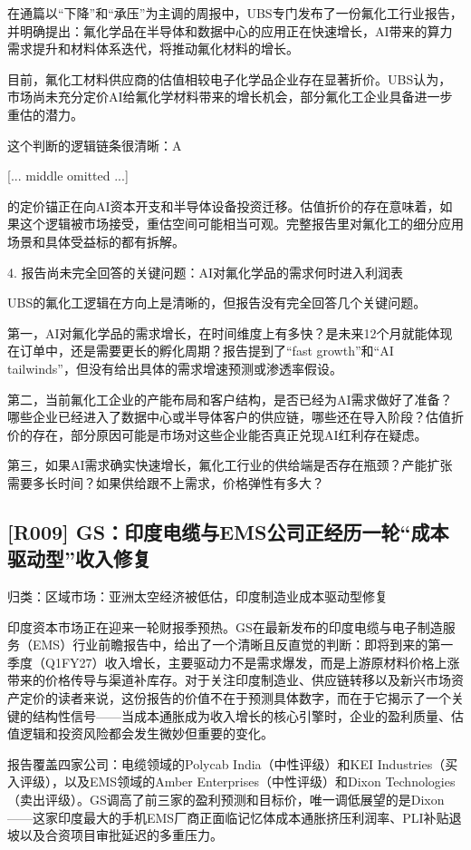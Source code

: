 \documentclass[11pt]{ctexart}
\begin{document}
在通篇以“下降”和“承压”为主调的周报中，UBS专门发布了一份氟化工行业报告，并明确提出：氟化学品在半导体和数据中心的应用正在快速增长，AI带来的算力需求提升和材料体系迭代，将推动氟化材料的增长。

目前，氟化工材料供应商的估值相较电子化学品企业存在显著折价。UBS认为，市场尚未充分定价AI给氟化学材料带来的增长机会，部分氟化工企业具备进一步重估的潜力。

这个判断的逻辑链条很清晰：A

[... middle omitted ...]

的定价锚正在向AI资本开支和半导体设备投资迁移。估值折价的存在意味着，如果这个逻辑被市场接受，重估空间可能相当可观。完整报告里对氟化工的细分应用场景和具体受益标的都有拆解。

4. 报告尚未完全回答的关键问题：AI对氟化学品的需求何时进入利润表

UBS的氟化工逻辑在方向上是清晰的，但报告没有完全回答几个关键问题。

第一，AI对氟化学品的需求增长，在时间维度上有多快？是未来12个月就能体现在订单中，还是需要更长的孵化周期？报告提到了“fast growth”和“AI tailwinds”，但没有给出具体的需求增速预测或渗透率假设。

第二，当前氟化工企业的产能布局和客户结构，是否已经为AI需求做好了准备？哪些企业已经进入了数据中心或半导体客户的供应链，哪些还在导入阶段？估值折价的存在，部分原因可能是市场对这些企业能否真正兑现AI红利存在疑虑。

第三，如果AI需求确实快速增长，氟化工行业的供给端是否存在瓶颈？产能扩张需要多长时间？如果供给跟不上需求，价格弹性有多大？

\subsection{[R009] GS：印度电缆与EMS公司正经历一轮“成本驱动型”收入修复}
{\small\color{refgray}归类：区域市场：亚洲太空经济被低估，印度制造业成本驱动型修复}

印度资本市场正在迎来一轮财报季预热。GS在最新发布的印度电缆与电子制造服务（EMS）行业前瞻报告中，给出了一个清晰且反直觉的判断：即将到来的第一季度（Q1FY27）收入增长，主要驱动力不是需求爆发，而是上游原材料价格上涨带来的价格传导与渠道补库存。对于关注印度制造业、供应链转移以及新兴市场资产定价的读者来说，这份报告的价值不在于预测具体数字，而在于它揭示了一个关键的结构性信号——当成本通胀成为收入增长的核心引擎时，企业的盈利质量、估值逻辑和投资风险都会发生微妙但重要的变化。

报告覆盖四家公司：电缆领域的Polycab India（中性评级）和KEI Industries（买入评级），以及EMS领域的Amber Enterprises（中性评级）和Dixon Technologies（卖出评级）。GS调高了前三家的盈利预测和目标价，唯一调低展望的是Dixon——这家印度最大的手机EMS厂商正面临记忆体成本通胀挤压利润率、PLI补贴退坡以及合资项目审批延迟的多重压力。
\end{document}
